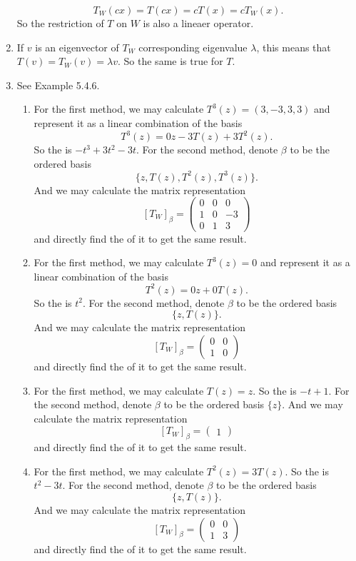 \begin{enumerate}
\[T_W(cx)=T(cx)=cT(x)=cT_W(x).\]
So the restriction of $T$ on $W$ is also a lineaer operator.
\item If $v$ is an eigenvector of $T_W$ corresponding eigenvalue $\lambda$, this means that $T(v)=T_W(v)=\lambda v$. So the same is true for $T$.
\item See Example 5.4.6.
\begin{enumerate}
\item For the first method, we may calculate $T^3(z)=(3,-3,3,3)$ and represent it as a linear combination of the basis 
\[T^3(z)=0z-3T(z)+3T^2(z).\]
So the \charpoly{} is $-t^3+3t^2-3t$.
For the second method, denote $\beta$ to be the ordered basis 
\[\{z,T(z),T^2(z),T^3(z)\}.\]
And we may calculate the matrix representation 
\[[T_W]_{\beta}=\begin{pmatrix}0&0&0\\1&0&-3\\0&1&3\end{pmatrix}\]
and directly find the \charpoly{} of it to get the same result.
\item For the first method, we may calculate $T^3(z)=0$ and represent it as a linear combination of the basis 
\[T^2(z)=0z+0T(z).\]
So the \charpoly{} is $t^2$.
For the second method, denote $\beta$ to be the ordered basis 
\[\{z,T(z)\}.\]
And we may calculate the matrix representation 
\[[T_W]_{\beta}=\begin{pmatrix}0&0\\1&0\end{pmatrix}\]
and directly find the \charpoly{} of it to get the same result.
\item For the first method, we may calculate $T(z)=z$. So the \charpoly{} is $-t+1$.
For the second method, denote $\beta$ to be the ordered basis $\{z\}$.
And we may calculate the matrix representation 
\[[T_W]_{\beta}=\begin{pmatrix}1\end{pmatrix}\]
and directly find the \charpoly{} of it to get the same result.
\item For the first method, we may calculate $T^2(z)=3T(z)$. So the \charpoly{} is $t^2-3t$.
For the second method, denote $\beta$ to be the ordered basis 
\[\{z,T(z)\}.\]
And we may calculate the matrix representation 
\[[T_W]_{\beta}=\begin{pmatrix}0&0\\1&3\end{pmatrix}\]
and directly find the \charpoly{} of it to get the same result.
\end{enumerate}

\end{enumerate}
